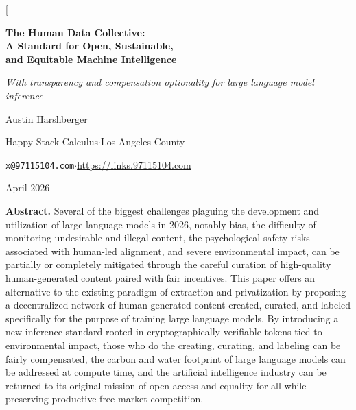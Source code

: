 \documentclass[10pt,a4paper,twocolumn]{article}
\begin{document}
\twocolumn[{%
\begin{center}
{\LARGE\bfseries The Human Data Collective:\\[3pt]A Standard for Open, Sustainable,\\[2pt]and Equitable Machine Intelligence\par}
\vspace{6pt}
{\normalsize\itshape With transparency and compensation optionality for large language model inference\par}
\vspace{10pt}
{\large Austin Harshberger\par}
\vspace{2pt}
{\small Happy Stack Calculus\quad$\cdot$\quad Los Angeles County\par}
{\small \texttt{x@97115104.com}\quad$\cdot$\quad \url{https://links.97115104.com}\par}
\vspace{4pt}
{\small April 2026\par}
\end{center}

\vspace{10pt}
\begin{center}
\begin{minipage}{0.92\textwidth}
\small\textbf{Abstract.}\quad
Several of the biggest challenges plaguing the development and utilization of large language models in 2026, notably bias, the difficulty of monitoring undesirable and illegal content, the psychological safety risks associated with human-led alignment, and severe environmental impact, can be partially or completely mitigated through the careful curation of high-quality human-generated content paired with fair incentives. This paper offers an alternative to the existing paradigm of extraction and privatization by proposing a decentralized network of human-generated content created, curated, and labeled specifically for the purpose of training large language models. By introducing a new inference standard rooted in cryptographically verifiable tokens tied to environmental impact, those who do the creating, curating, and labeling can be fairly compensated, the carbon and water footprint of large language models can be addressed at compute time, and the artificial intelligence industry can be returned to its original mission of open access and equality for all while preserving productive free-market competition.
\end{minipage}
\end{center}

}
\end{document}
